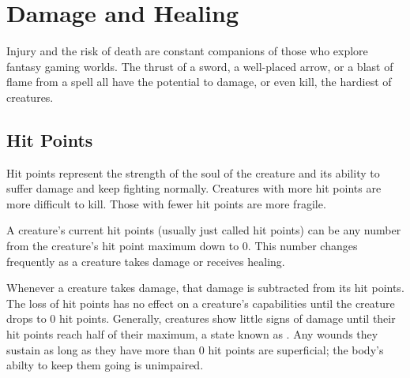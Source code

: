 \section{Damage and Healing}

Injury and the risk of death are constant companions of those who explore fantasy gaming worlds. The thrust of a sword, a well-placed arrow, or a blast of flame from a  spell all have the potential to damage, or even kill, the hardiest of creatures.

\subsection{Hit Points}

Hit points represent the strength of the soul of the creature and its ability to suffer damage and keep fighting normally. Creatures with more hit points are more difficult to kill. Those with fewer hit points are more fragile.

A creature's current hit points (usually just called hit points) can be any number from the creature's hit point maximum down to 0. This number changes frequently as a creature takes damage or receives healing.

Whenever a creature takes damage, that damage is subtracted from its hit points. The loss of hit points has no effect on a creature's capabilities until the creature drops to 0 hit points. Generally, creatures show little signs of damage until their hit points reach half of their maximum, a state known as . Any wounds they sustain as long as they have more than 0 hit points are superficial; the body's abilty to keep them going is unimpaired.

